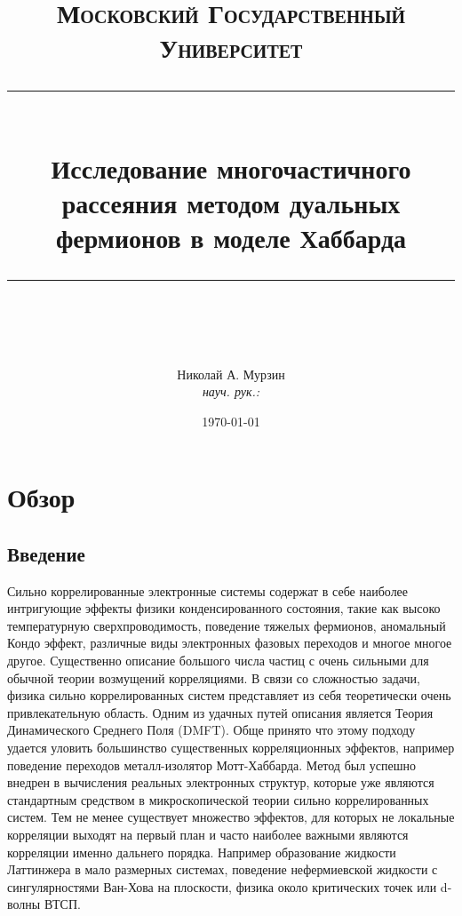 \documentclass[11pt,a4paper]{report}
\begin{document}
\newcommand{\horrule}[1]{\rule{\linewidth}{#1}}   %

\title{
  \vspace{-1in}
  \normalfont \normalsize \textsc{Московский Государственный Университет} \\ [25pt]
  \horrule{0.5pt} \\[0.4cm]
  \huge Исследование многочастичного рассеяния методом дуальных фермионов в моделе Хаббарда \\
  \horrule{2pt} \\[0.5cm]
}
\author{
  \normalfont
  \normalsize
  {Николай А. Мурзин}\\[-3pt]
  \normalsize
  {\it{науч. рук.:} }\\[-3pt]
  \normalsize
}
\date{\today}
\maketitle
\tableofcontents

\chapter{Обзор}

\section{Введение}

Сильно коррелированные электронные системы содержат в себе наиболее интригующие эффекты физики конденсированного состояния, такие как высоко температурную сверхпроводимость, 
поведение тяжелых фермионов, аномальный Кондо эффект, различные виды электронных фазовых переходов и многое многое другое\cite{anderson1984basic}\cite{anderson1997theory}\cite{scalapino1995case}\cite{hewson1997kondo}.
Существенно описание большого числа частиц с очень сильными для обычной теории возмущений корреляциями. В связи со сложностью задачи, физика сильно коррелированных систем представляет из себя теоретически очень привлекательную область.
Одним из удачных путей описания является Теория Динамического Среднего Поля (DMFT)\cite{georges1996dynamical}\cite{kotliar2004strongly}. Обще принято что этому подходу удается уловить большинство существенных корреляционных эффектов, например поведение
переходов металл-изолятор Мотт-Хаббарда\cite{mott1974metal}. Метод был успешно внедрен в вычисления реальных электронных структур\cite{anisimov1997first}\cite{lichtenstein1998ab}, которые уже являются стандартным средством в микроскопической теории сильно коррелированных систем.
Тем не менее существует множество эффектов, для которых не локальные корреляции выходят на первый план и часто наиболее важными являются корреляции именно дальнего порядка. 
Например образование жидкости Латтинжера в мало размерных системах\cite{anderson1997theory}\cite{mahan2000many}, поведение нефермиевской жидкости с сингулярностями Ван-Хова на плоскости\cite{irkhin2001effects}\cite{irkhin2002robustness},
физика около критических точек или d-волны ВТСП\cite{scalapino1995case}.
\end{document}
